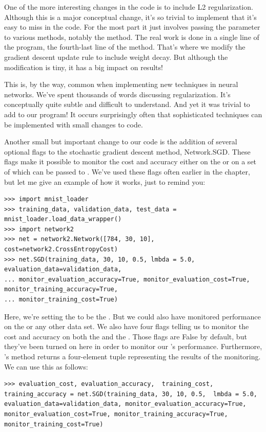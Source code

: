 \documentclass[a4paper,twoside,10pt]{book}
\begin{document}
One of the more interesting changes in the code is to include L2 regularization. Although this is a major conceptual change, it's so trivial to implement that it's easy to miss in the code. For the most part it just involves passing the parameter  to various methods, notably the  method. The real work is done in a single line of the program, the fourth-last line of the  method. That's where we modify the gradient descent update rule to include weight decay. But although the modification is tiny, it has a big impact on results!

This is, by the way, common when implementing new techniques in neural networks. We've spent thousands of words discussing regularization. It's conceptually quite subtle and difficult to understand. And yet it was trivial to add to our program! It occurs surprisingly often that sophisticated techniques can be implemented with small changes to code.

Another small but important change to our code is the addition of several optional flags to the stochastic gradient descent method, Network.SGD. These flags make it possible to monitor the cost and accuracy either on the  or on a set of  which can be passed to . We've used these flags often earlier in the chapter, but let me give an example of how it works, just to remind you:
\begin{lstlisting}
>>> import mnist_loader
>>> training_data, validation_data, test_data =  mnist_loader.load_data_wrapper()
>>> import network2
>>> net = network2.Network([784, 30, 10], cost=network2.CrossEntropyCost)
>>> net.SGD(training_data, 30, 10, 0.5, lmbda = 5.0, evaluation_data=validation_data,
... monitor_evaluation_accuracy=True, monitor_evaluation_cost=True, monitor_training_accuracy=True,
... monitor_training_cost=True)
\end{lstlisting}
Here, we're setting the  to be the . But we could also have monitored performance on the  or any other data set. We also have four flags telling us to monitor the cost and accuracy on both the  and the . Those flags are False by default, but they've been turned on here in order to monitor our 's performance. Furthermore, 's  method returns a four-element tuple representing the results of the monitoring. We can use this as follows:
\begin{lstlisting}
>>> evaluation_cost, evaluation_accuracy,  training_cost, training_accuracy = net.SGD(training_data, 30, 10, 0.5,  lmbda = 5.0, evaluation_data=validation_data, monitor_evaluation_accuracy=True, monitor_evaluation_cost=True, monitor_training_accuracy=True, monitor_training_cost=True)
\end{lstlisting}
\end{document}
